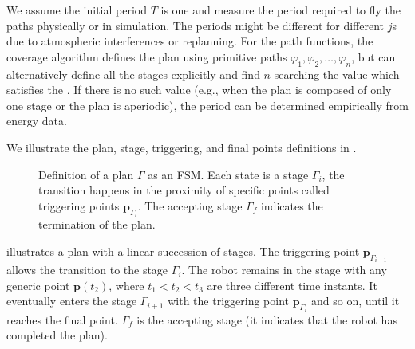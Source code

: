 We assume the initial period $T$ is one and measure the period required to fly the paths physically or in simulation. The periods might be different for different $j$s due to atmospheric interferences or replanning. For the path functions, the coverage algorithm defines the plan using primitive paths $\varphi_1,\varphi_2,\dots,\varphi_n$, but can alternatively define all the stages explicitly and find $n$ searching the value which satisfies the . If there is no such value (e.g., when the plan is composed of only one stage or the plan is aperiodic), the period can be determined empirically from energy data.

We illustrate the plan, stage, triggering, and final points definitions in .

\begin{figure}[h!]
  \center
  \caption[Definition of a plan]{Definition of a plan $\Gamma$ as an FSM. Each state is a stage $\Gamma_i$, the transition happens in the proximity of specific points called triggering points $\mathbf{p}_{\Gamma_i}$. The accepting stage $\Gamma_f$ indicates the termination of the plan.}
  \label{fig:state-machine}
\end{figure}
 illustrates a plan with a linear succession of stages. The triggering point $\mathbf{p}_{\Gamma_{i-1}}$ allows the transition to the stage $\Gamma_i$. The robot remains in the stage with any generic point $\mathbf{p}(t_2)$, where $t_1<t_2<t_3$ are three different time instants. It eventually enters the stage $\Gamma_{i+1}$ with the triggering point $\mathbf{p}_{\Gamma_i}$ and so on, until it reaches the final point. $\Gamma_f$ is the accepting stage (it indicates that the robot has completed the plan).
